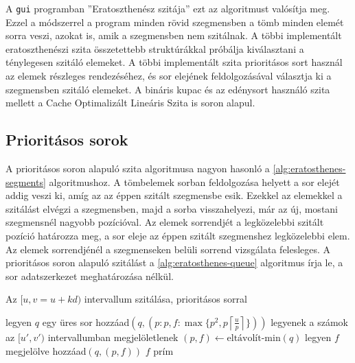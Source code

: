 A \texttt{gui} programban ''Eratoszthenész szitája'' ezt az algoritmust valósítja meg.
Ezzel a módszerrel a program minden rövid szegmensben a tömb minden elemét sorra veszi, azokat is, amik a szegmensben nem szitálnak.
A többi implementált eratoszthenészi szita összetettebb struktúrákkal próbálja kiválasztani a ténylegesen szitáló elemeket.
A többi implementált szita prioritásos sort használ az elemek részleges rendezéséhez, és sor elejének feldolgozásával választja ki a szegmensben szitáló elemeket.
A bináris kupac és az edénysort használó szita mellett a Cache Optimalizált Lineáris Szita is soron alapul.

\subsection{Prioritásos sorok}

A prioritásos soron alapuló szita algoritmusa nagyon hasonló a \ref{alg:eratosthenes-segments} algoritmushoz.
A tömbelemek sorban feldolgozása helyett a sor elejét addig veszi ki, amíg az az éppen szitált szegmensbe esik.
Ezekkel az elemekkel a szitálást elvégzi a szegmensben, majd a sorba visszahelyezi, már az új, mostani szegmensnél nagyobb pozícióval.
Az elemek sorrendjét a legközelebbi szitált pozíció határozza meg, a sor eleje az éppen szitált szegmenshez legközelebbi elem.
Az elemek sorrendjénél a szegmenseken belüli sorrend vizsgálata felesleges.
A prioritásos soron alapuló szitálást a \ref{alg:eratosthenes-queue} algoritmus írja le, a sor adatszerkezet meghatározása nélkül.

\begin{algorithm}[H]
\caption{Az $[u, v=u+kd)$ intervallum szitálása, prioritásos sorral}
\label{alg:eratosthenes-queue}
\begin{algorithmic}[1]
\State legyen $q$ egy üres sor
	\State hozzáad$(q, (p: p, f: \max \lbrace p^2, p \left \lceil{\frac{u}{p}}\right \rceil \rbrace ))$
\EndFor
{}
	\State legyenek a számok az $[u', v')$ intervallumban megjelöletlenek
		\State $(p, f) \gets \textrm{eltávolít-min}(q)$
			\State legyen $f$ megjelölve
		\EndFor
		\State hozzáad$(q, (p, f))$
	\EndWhile
	\For{$f \in [u', v')$}
			\State $f$ prím
		\EndIf
	\EndFor
\EndFor
\end{algorithmic}
\end{algorithm}

